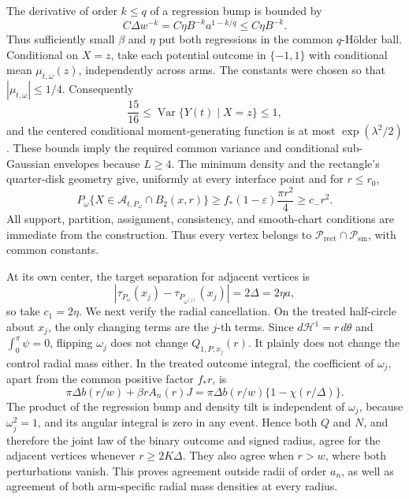 The derivative of order \(k\leq q\) of a regression bump is bounded by
\[
 C\Delta w^{-k}=C\eta B^{-k}a^{1-k/q}\leq C\eta B^{-k}.
\]
Thus sufficiently small \(\beta\) and \(\eta\) put both regressions in the common \(q\)-H\"older ball.  Conditional on \(X=z\), take each potential outcome in \(\{-1,1\}\) with conditional mean \(\mu_{t,\omega}(z)\), independently across arms.  The constants were chosen so that \(|\mu_{t,\omega}|\leq1/4\).  Consequently
\[
 \frac{15}{16}\leq\operatorname{Var}\{Y(t)\mid X=z\}\leq1,
\]
and the centered conditional moment-generating function is at most \(\exp(\lambda^2/2)\).  These bounds imply the required common variance and conditional sub-Gaussian envelopes because \(L\geq4\).  The minimum density and the rectangle's quarter-disk geometry give, uniformly at every interface point and for \(r\leq r_0\),
\[
 P_\omega\{X\in\mathcal A_{t,P_\omega}\cap B_2(x,r)\}
 \geq f_*(1-\varepsilon)\frac{\pi r^2}{4}
 \geq c_-r^2.
\]
All support, partition, assignment, consistency, and smooth-chart conditions are immediate from the construction.  Thus every vertex belongs to \(\mathcal P_{\mathrm{rect}}\cap\mathcal P_{\mathrm{sm}}\), with common constants.

At its own center, the target separation for adjacent vertices is
\[
 |\tau_{P_\omega}(x_j)-\tau_{P_{\omega^{(j)}}}(x_j)|=2\Delta=2\eta a,
\]
so take \(c_1=2\eta\).  We next verify the radial cancellation.  On the treated half-circle about \(x_j\), the only changing terms are the \(j\)-th terms.  Since \(d\mathcal H^1=r\,d\theta\) and \(\int_0^\pi\psi=0\), flipping \(\omega_j\) does not change \(Q_{1,P,x_j}(r)\).  It plainly does not change the control radial mass either.  In the treated outcome integral, the coefficient of \(\omega_j\), apart from the common positive factor \(f_*r\), is
\[
 \pi\Delta b(r/w)+\beta rA_n(r)J
 =\pi\Delta b(r/w)\{1-\chi(r/\Delta)\}.
\]
The product of the regression bump and density tilt is independent of \(\omega_j\), because \(\omega_j^2=1\), and its angular integral is zero in any event.  Hence both \(Q\) and \(N\), and therefore the joint law of the binary outcome and signed radius, agree for the adjacent vertices whenever \(r\geq2K\Delta\).  They also agree when \(r>w\), where both perturbations vanish.  This proves agreement outside radii of order \(a_n\), as well as agreement of both arm-specific radial mass densities at every radius.

